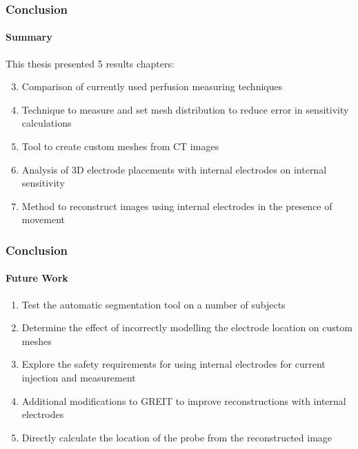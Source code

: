\documentclass[10pt,    %
    english,            %
    xcolor=table,       %
    envcountsect,        %
    aspectratio=1610
]{beamer}
\begin{document}
\begin{frame}
\frametitle{Conclusion}
\framesubtitle{Summary}
This thesis presented 5 results chapters:
\vspace{2mm}
\begin{enumerate}
	\setcounter{enumi}{2}
	\item Comparison of currently used perfusion measuring techniques
	\vspace{2mm}
	\item Technique to measure and set mesh distribution to reduce error in sensitivity calculations
	\vspace{2mm}
	\item Tool to create custom meshes from CT images
	\vspace{2mm}
	\item Analysis of 3D electrode placements with internal electrodes on internal sensitivity 
	\vspace{2mm}
	\item Method to reconstruct images using internal electrodes in the presence of movement 
\end{enumerate}
\end{frame}

\begin{frame}
\frametitle{Conclusion}
\framesubtitle{Future Work}
\begin{enumerate}
	\item Test the automatic segmentation tool on a number of subjects 
	\vspace{2mm}
	\item Determine the effect of incorrectly modelling the electrode location on custom meshes
	\vspace{2mm}
	\item Explore the safety requirements for using internal electrodes for current injection and measurement 
	\vspace{2mm}
	\item Additional modifications to GREIT to improve reconstructions with internal electrodes
	\vspace{2mm}
	\item Directly calculate the location of the probe from the reconstructed image
\end{enumerate}

\end{frame}

\begin{frame}
  \titlepage
\end{frame}

\end{document}
